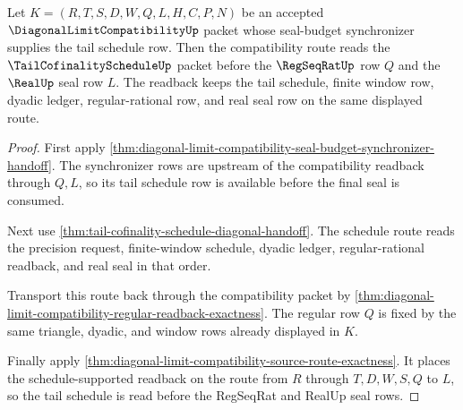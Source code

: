 \begin{theorem}
\label{thm:diagonal-limit-compatibility-tail-schedule-readback}
Let $K=(R,T,S,D,W,Q,L,H,C,P,N)$ be an accepted $\DiagonalLimitCompatibilityUp$ packet whose seal-budget synchronizer supplies the tail schedule row. Then the compatibility route reads the $\TailCofinalityScheduleUp$ packet before the $\RegSeqRatUp$ row $Q$ and the $\RealUp$ seal row $L$. The readback keeps the tail schedule, finite window row, dyadic ledger, regular-rational row, and real seal row on the same displayed route.
\end{theorem}
\begin{proof}
First apply \autoref{thm:diagonal-limit-compatibility-seal-budget-synchronizer-handoff}. The synchronizer rows are upstream of the compatibility readback through $Q,L$, so its tail schedule row is available before the final seal is consumed.

Next use \autoref{thm:tail-cofinality-schedule-diagonal-handoff}. The schedule route reads the precision request, finite-window schedule, dyadic ledger, regular-rational readback, and real seal in that order.

Transport this route back through the compatibility packet by \autoref{thm:diagonal-limit-compatibility-regular-readback-exactness}. The regular row $Q$ is fixed by the same triangle, dyadic, and window rows already displayed in $K$.

Finally apply \autoref{thm:diagonal-limit-compatibility-source-route-exactness}. It places the schedule-supported readback on the route from $R$ through $T,D,W,S,Q$ to $L$, so the tail schedule is read before the RegSeqRat and RealUp seal rows.
\end{proof}

